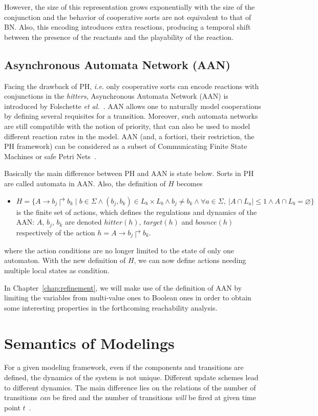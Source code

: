 However, the size of this representation grows exponentially with the size of the conjunction and the behavior of cooperative sorts are not equivalent to that of BN. 
Also, this encoding introduces extra reactions, producing a temporal shift between the presence of the reactants and the playability of the reaction.

\subsection{Asynchronous Automata Network (AAN)}\label{sec:AAN}
Facing the drawback of PH, \textit{i.e.} only cooperative sorts can encode reactions with conjunctions in the \textit{hitters}, Asynchronous Automata Network (AAN) is introduced by Folschette \textit{et al.}~\cite{folschette2015}.
AAN allows one to naturally model cooperations by defining several requisites for a transition.
Moreover, such automata networks are still compatible with the notion of priority, that can also be used to model different reaction rates in the model.
AAN (and, a fortiori, their restriction, the PH framework) can be considered as a subset of Communicating Finite State Machines or safe Petri Nets~\cite{pauleve2012process}.

Basically the main difference between PH and AAN is state below. 
Sorts in PH are called automata in AAN.
Also, the definition of $H$ becomes

\begin{itemize}
    \item $H=\{A\to b_j\Rsh b_k\mid b\in \Sigma \land (b_j,b_k)\in L_b\times L_b\land b_j\neq b_k\land \forall a \in \Sigma,\ |A\cap L_a|\leq 1 \land A\cap L_b=\varnothing\}$ is the finite set of actions, which defines the regulations and dynamics of the AAN: $A$, $b_j$, $b_k$ are denoted $hitter(h)$, $target(h)$ and $bounce(h)$ respectively of the action $h=A\to b_j\Rsh b_k$.
\end{itemize}

where the action conditions are no longer limited to the state of only one automaton.
With the new definition of $H$, we can now define actions needing multiple local states as condition.

In Chapter~\ref{chap:refinement}, we will make use of the definition of AAN by limiting the variables from multi-value ones to Boolean ones in order to obtain some interesting properties in the forthcoming reachability analysis.


\section{Semantics of Modelings}\label{sec:semantics}
For a given modeling framework, even if the components and transitions are defined, the dynamics of the system is not unique. 
Different update schemes lead to different dynamics.
The main difference lies on the relations of the number of transitions \textit{can} be fired and the number of transitions \textit{will} be fired at given time point $t$~\cite{ribeiro2018learning,chatain2018boolean}.

